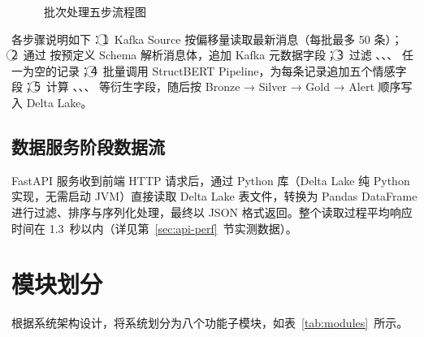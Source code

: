 \begin{figure}[htbp]
\caption{ 批次处理五步流程图}
\label{fig:pipeline}
\end{figure}

各步骤说明如下：\textcircled{1}~Kafka Source 按偏移量读取最新消息（每批最多 50 条）；\textcircled{2}~通过  按预定义 Schema 解析消息体，追加 Kafka 元数据字段；\textcircled{3}~过滤 、、、 任一为空的记录；\textcircled{4}~批量调用 StructBERT Pipeline，为每条记录追加五个情感字段；\textcircled{5}~计算 、、、 等衍生字段，随后按 Bronze → Silver → Gold → Alert 顺序写入 Delta Lake。

\subsection{数据服务阶段数据流}

FastAPI 服务收到前端 HTTP 请求后，通过  Python 库（Delta Lake 纯 Python 实现，无需启动 JVM）直接读取 Delta Lake 表文件，转换为 Pandas DataFrame 进行过滤、排序与序列化处理，最终以 JSON 格式返回。整个读取过程平均响应时间在 1.3~秒以内（详见第~\ref{sec:api-perf}~节实测数据）。

\section{模块划分}
\label{sec:modules}

根据系统架构设计，将系统划分为八个功能子模块，如表~\ref{tab:modules}~所示。

